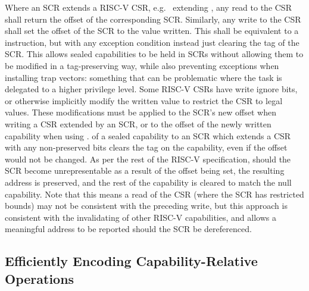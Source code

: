 Where an SCR extends a RISC-V CSR, e.g.\ \MTCC{} extending \mtvec{},
any read to the CSR shall return the offset of the corresponding SCR.
Similarly, any write to the CSR shall set the offset of the SCR to the value
written.
This shall be equivalent to a  instruction, but with
any exception condition instead just clearing the tag of the SCR.
This allows sealed capabilities to be held in SCRs without allowing them to
be modified in a tag-preserving way, while also preventing exceptions when
installing trap vectors: something that can be problematic where the task
is delegated to a higher privilege level.
Some RISC-V CSRs have write ignore bits, or otherwise implicitly modify
the written value to restrict the CSR to legal values.
These modifications must be applied to the SCR's new offset when writing a CSR
extended by an SCR, or to the offset of the newly written capability when
using .
 of a sealed capability to an SCR which extends a CSR
with any non-preserved bits clears the tag on the capability, even if the
offset would not be changed.
As per the rest of the RISC-V specification, should the SCR become
unrepresentable as a result of the offset being set, the resulting address is
preserved, and the rest of the capability is cleared to match the null
capability.
Note that this means a read of the CSR (where the SCR has restricted bounds)
may not be consistent with the preceding write, but this approach is
consistent with the invalidating of other RISC-V capabilities, and allows a
meaningful address to be reported should the SCR be dereferenced.

 

\subsection{Efficiently Encoding Capability-Relative Operations}
\label{subsec-encoding-cap-ops}

